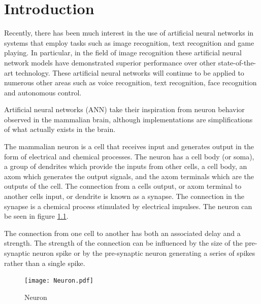 
\chapter{Introduction}
\label{sec:chap-one}

Recently, there has been much interest in the use of artificial neural networks in systems that employ tasks such as image recognition\cite{krizhevsky2012imagenet}, text recognition\cite{qiu2013parallel} and game playing\cite{maddison2014move}.
In particular, in the field of image recognition these artificial neural network models have demonstrated superior performance
over other state-of-the-art technology\cite{krizhevsky2012imagenet}.
These artificial neural networks will continue to be applied to numerous other areas such as voice recognition, text recognition, 
face recognition and autonomous control.

Artificial neural networks (ANN) take their inspiration from neuron behavior observed in the mammalian brain, although implementations are simplifications of what actually exists in the brain.

The mammalian neuron is a cell that receives input and generates output in the form of electrical and chemical processes.
The neuron has a cell body (or soma), a group of dendrites which provide the inputs from other cells, a cell body, an axom which generates the output signals, and the axom terminals which are the outputs of the cell.
The connection from a cells output, or axom terminal to another cells input, or dendrite is known as a synapse. 
The connection in the synapse is a chemical process stimulated by electrical impulses.
The neuron can be seen in figure \ref{fig:neuron}.

The connection from one cell to another has both an associated delay and a strength. The strength of the connection can be influenced by the size of the pre-synaptic neuron spike or by the pre-synaptic neuron generating a series of spikes rather than a single spike.

\begin{figure}[!t]
\centering
\captionsetup{justification=centering}
\captionsetup{width=.9\linewidth}
\centerline{
\mbox{\texttt{[image: Neuron.pdf]}}
}
\caption{Neuron}
\label{fig:neuron}
\end{figure}



